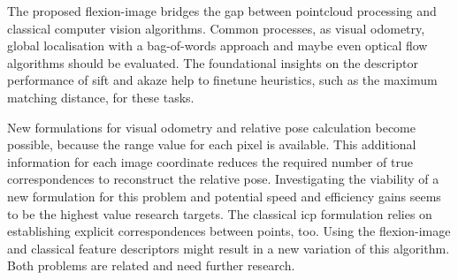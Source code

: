 The proposed \gls{flexion-image} bridges the gap between pointcloud processing and classical computer vision algorithms.
Common processes, as visual odometry, global localisation with a bag-of-words approach and maybe even optical flow algorithms should be evaluated.
The foundational insights on the descriptor performance of \acrshort{sift} and \acrshort{akaze} help to finetune heuristics, such as the maximum matching distance, for these tasks.

New formulations for visual odometry and relative pose calculation become possible, because the range value for each pixel is available.
This additional information for each image coordinate reduces the required number of true correspondences to reconstruct the relative pose.
Investigating the viability of a new formulation for this problem and potential speed and efficiency gains seems to be the highest value research targets.
The classical \acrshort{icp} formulation relies on establishing explicit correspondences between points, too.
Using the \gls{flexion-image} and classical feature descriptors might result in a new variation of this algorithm.
Both problems are related and need further research.
